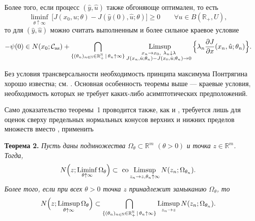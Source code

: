 {  Более того, если процесс $(\hat{y},\hat{u})$ также обгоняюще оптимален, то есть
  \[ \liminf_{\theta\uparrow\infty}\
  \big[J(x_0, u; \theta)-J(\hat{y}(0), \hat{u}; \theta)\big]
  \geq 0\qquad \forall u\in B(\mathbb{R}_+,U),\]
  то для $(\hat{y},\hat{u})$ можно считать выполненным и  более сильное краевое условие
	\begin{equation*}
-{\psi}(0)\in N(x_0;\mathcal{C}_{ \mathrm{as}})+\bigcap_{\{(\theta_n)_{n\in\mathbb{N}}\in\mathbb{R}_{+}^{\mathbb{N}}\,|\,\theta_n\uparrow\infty\}}
\mathop{\hbox{  \rm{Limsup}}}_{\substack
	{x_n\to x_0,\ \lambda_n\downarrow {\lambda}\\ {J}(x_n,\hat{u};\theta_n)-{J}(x_0,\hat{u};\theta_n)\to 0}
}
\Big\{\lambda_n\frac{\partial {J}}{\partial x}(x_n,\hat{u};\theta_n)
\Big\}.
\label{khlopin_ALL2}
\end{equation*}
}






 Без условия трансверсальности необходимость принципа максимума Понтрягина хорошо известна; см. \cite{Halkin}. Основная особенность теоремы выше ---  краевые условия, необходимость которых не требует каких-либо асимптотических предположений.




  	Само доказательство теоремы~1 проводится также, как и \cite[Theorem~4.1,Theorem~4.6]{arxiv}, требуется лишь  для оценок сверху  предельных нормальных конусов верхних и нижних пределов множеств вместо \cite[Lemma~6.1,6.7]{arxiv},
  	\cite[Theorem~6.2]{Ledyaev} применить

	{\bf Теорема 2.} {\it       Пусть даны подмножества  $\Omega_\theta\subset\mathbb{R}^m$  $(\theta> 0)$ и
		точка $z\in\mathbb{R}^m$. Тогда,
				\begin{align*}
		N\Big(z;\mathop{  \rm{Liminf}}_{\theta\uparrow\infty}\Omega_\theta\Big)\subset
			\mathop{\hbox{  \rm{co}}}
		\mathop{  \rm{Limsup}}_{{z}_n\to z,\theta_n\uparrow\infty}  {N}({z}_n;\Omega_{\theta_n}).
		\end{align*}
		Более того, если при всех  $\theta> 0$
		точка $z$ принадлежит замыканию $\Omega_\theta$, то
				\begin{align*}
		N\Big(z; \mathop{  \rm{Limsup}}_{\theta\uparrow\infty} \Omega_\theta\Big)
		\subset
		\bigcap_{\{(\theta_n)_{n\in\mathbb{N}}\in\mathbb{R}_{+}^{\mathbb{N}}\,|\,\theta_n\uparrow\infty\}}
		        \mathop{  \rm{Limsup}}_{{z}_n\to {z}}{N}({z}_n;\Omega_{\theta_n}).
		\end{align*}
	}

